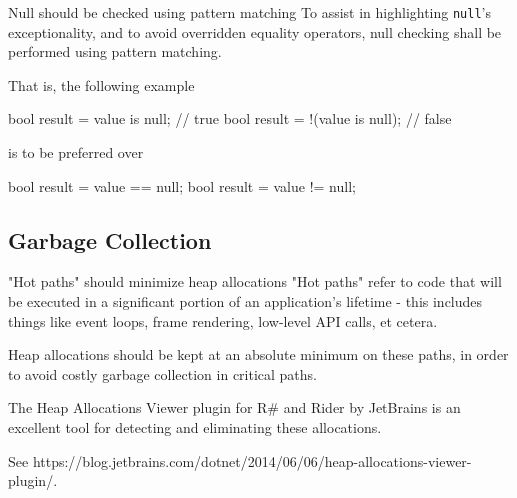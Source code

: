 \documentclass[11pt,a4paper]{article}
\begin{document}
\begin{should}{Null should be checked using pattern matching}
To assist in highlighting \texttt{null}'s exceptionality, and to avoid overridden equality operators, null checking shall be performed using pattern matching.
\end{should}

That is, the following example
\begin{code}
bool result = value is null; // true
bool result = !(value is null); // false
\end{code}

is to be preferred over

\begin{code}
bool result = value == null;
bool result = value != null;
\end{code}

\subsection{Garbage Collection}
\begin{should}{"Hot paths" should minimize heap allocations}
"Hot paths" refer to code that will be executed in a significant portion of an application's lifetime - this includes things like event loops, frame rendering, low-level API calls, et cetera. 

Heap allocations should be kept at an absolute minimum on these paths, in order to avoid costly garbage collection in critical paths.
\end{should}

The Heap Allocations Viewer plugin for R\# and Rider by JetBrains is an excellent tool for detecting and eliminating these allocations.

See https://blog.jetbrains.com/dotnet/2014/06/06/heap-allocations-viewer-plugin/.

\printbibliography
\end{document}
